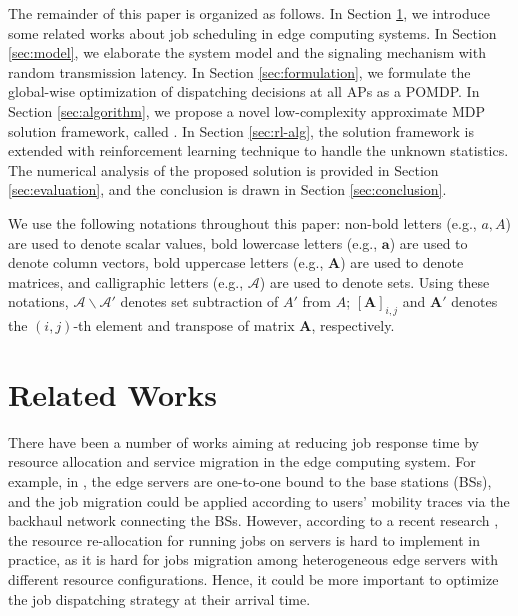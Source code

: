 The remainder of this paper is organized as follows.
In Section \ref{sec:review}, we introduce some related works about job scheduling in edge computing systems.
In Section \ref{sec:model}, we elaborate the system model and the signaling mechanism with random transmission latency.
In Section \ref{sec:formulation}, we formulate the global-wise optimization of dispatching decisions at all APs as a POMDP.
In Section \ref{sec:algorithm}, we propose a novel low-complexity approximate MDP solution framework, called \algname.
In Section \ref{sec:rl-alg}, the solution framework is extended with reinforcement learning technique to handle the unknown statistics.
The numerical analysis of the proposed solution is provided in Section \ref{sec:evaluation}, and the conclusion is drawn in Section \ref{sec:conclusion}.

We use the following notations throughout this paper: 
non-bold letters (e.g., $a, A$) are used to denote scalar values,
bold lowercase letters (e.g., $\mathbf{a}$) are used to denote column vectors,
bold uppercase letters (e.g., $\mathbf{A}$) are used to denote matrices,
and calligraphic letters (e.g., $\mathcal{A}$) are used to denote sets.
Using these notations, $\mathcal{A}\backslash\mathcal{A'}$ denotes set subtraction of $A'$ from $A$; $[\mathbf{A}]_{i,j}$ and $\mathbf{A}'$ denotes the $(i,j)$-th element and transpose of matrix $\mathbf{A}$, respectively.

\section{Related Works}
\label{sec:review}
There have been a number of works aiming at reducing job response time by resource allocation and service migration in the edge computing system.
For example, in \cite{TON19-WangSq}, the edge servers are one-to-one bound to the base stations (BSs), and the job migration could be applied according to users' mobility traces via the backhaul network connecting the BSs.
However, according to a recent research \cite{INFOCOM19-WuC}, the resource re-allocation for running jobs on servers is hard to implement in practice, as it is hard for jobs migration among heterogeneous edge servers with different resource configurations.
Hence, it could be more important to optimize the job dispatching strategy at their arrival time.

